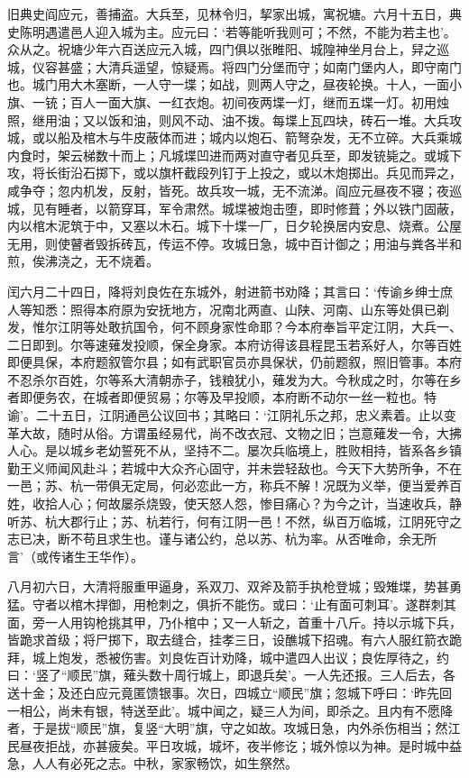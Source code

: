 \documentclass[]{article}
\begin{document}
旧典史阎应元，善捕盗。大兵至，见林令归，挈家出城，寓祝塘。六月十五日，典史陈明遇遣邑人迎入城为主。应元曰：`若等能听我则可；不然，不能为若主也'。众从之。祝塘少年六百送应元入城，四门俱以张睢阳、城隍神坐月台上，舁之巡城，仪容甚盛；大清兵遥望，惊疑焉。将四门分堡而守；如南门堡内人，即守南门也。城门用大木塞断，一人守一堞；如战，则两人守之，昼夜轮换。十人，一面小旗、一铳；百人一面大旗、一红衣炮。初间夜两堞一灯，继而五堞一灯。初用烛照，继用油；又以饭和油，则风不动、油不拨。每堞上瓦四块，砖石一堆。大兵攻城，或以船及棺木与牛皮蔽体而进；城内以炮石、箭弩杂发，无不立碎。大兵乘城内食时，架云梯数十而上；凡城堞凹进而两对直守者见兵至，即发铳毙之。或城下攻，将长街沿石掷下，或以旗杆截段列钉于上投之，或以木炮掷出。兵见而异之，咸争夺；忽内机发，反射，皆死。故兵攻一城，无不流涕。阎应元昼夜不寝；夜巡城，见有睡者，以箭穿耳，军令肃然。城堞被炮击堕，即时修葺；外以铁门固蔽，内以棺木泥筑于中，又塞以木石。城下十堞一厂，日夕轮换居内安息、烧煮。公屋无用，则使瞽者毁拆砖瓦，传运不停。攻城日急，城中百计御之；用油与粪各半和煎，俟沸浇之，无不烧着。

闰六月二十四日，降将刘良佐在东城外，射进箭书劝降；其言曰：`传谕乡绅士庶人等知悉：照得本府原为安抚地方，况南北两直、山陕、河南、山东等处俱已剃发，惟尔江阴等处敢抗国令，何不顾身家性命耶？今本府奉旨平定江阴，大兵一、二日即到。尔等速薙发投顺，保全身家。本府访得该县程昆玉若系好人，尔等百姓即便具保，本府题叙管尔县；如有武职官员亦具保状，仍前题叙，照旧管事。本府不忍杀尔百姓，尔等系大清朝赤子，钱粮犹小，薙发为大。今秋成之时，尔等在乡者即便务农，在城者即便贸易；尔等及早投顺，本府断不动尔一丝一粒也。特谕'。二十五日，江阴通邑公议回书；其略曰：`江阴礼乐之邦，忠义素着。止以变革大故，随时从俗。方谓虽经易代，尚不改衣冠、文物之旧；岂意薙发一令，大拂人心。是以城乡老幼誓死不从，坚持不二。屡次兵临境上，胜败相持，皆系各乡镇勤王义师闻风赴斗；若城中大众齐心固守，并未尝轻敌也。今天下大势所争，不在一邑；苏、杭一带俱无定局，何必恋此一方，称兵不解！况既为义举，便当爱养百姓，收拾人心；何故屡杀烧毁，使天怒人怨，惨目痛心？为今之计，当速收兵，静听苏、杭大郡行止；苏、杭若行，何有江阴一邑！不然，纵百万临城，江阴死守之志已决，断不苟且求生也。谨与诸公约，总以苏、杭为率。从否唯命，余无所言'（或传诸生王华作）。

八月初六日，大清将服重甲逼身，系双刀、双斧及箭手执枪登城；毁雉堞，势甚勇猛。守者以棺木捍御，用枪刺之，俱折不能伤。或曰：`止有面可刺耳'。遂群刺其面，旁一人用钩枪挑其甲，乃仆棺中；又一人斩之，首重十八斤。持以示城下兵，皆跪求首级；将尸掷下，取去缝合，挂孝三日，设醮城下招魂。有六人服红箭衣跪拜，城上炮发，悉被伤害。刘良佐百计劝降，城中遣四人出议；良佐厚待之，约曰：`竖了``顺民''旗，薙头数十周行城上，即退兵矣'。一人先还报。三人后去，各送十金；及还白应元竟匿馈银事。次日，四城立``顺民''旗；忽城下呼曰：`昨先回一相公，尚未有银，特送至此'。城中闻之，疑三人为间，即杀之。且内有不愿降者，于是拔``顺民''旗，复竖``大明''旗，守之如故。攻城日急，内外杀伤相当；然江民昼夜拒战，亦甚疲矣。平日攻城，城坏，夜半修讫；城外惊以为神。是时城中益急，人人有必死之志。中秋，家家畅饮，如生祭然。
\end{document}
